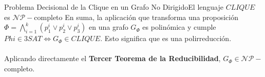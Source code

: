 \documentclass[10pt, envcountsect, presentation, aspectratio=169]{beamer}
\begin{document}
\begin{frame}{Problema Decisional de la Clique en un Grafo No Dirigido}{El lenguaje $CLIQUE$ es $\mathcal{NP}-$completo}
    En suma, la aplicación que transforma una proposición $\Phi=\bigwedge_{i=1}^k(p_1^i \vee p_2^i \vee p_3^i)$ en una grafo $G_\Phi$ es polinómica y cumple $Phi \in 3SAT \Leftrightarrow G_\Phi \in CLIQUE$. Esto significa que es una polirreducción. \\~\\ 

    Aplicando directamente el \textbf{Tercer Teorema de la Reducibilidad}, $G_\Phi \in \mathcal{NP}-$completo. $\boxed{ }$
\end{frame}
\end{document}

